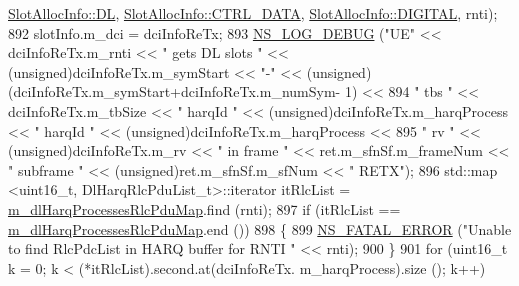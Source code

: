 \begin{DoxyCode}
      \hyperlink{structns3_1_1SlotAllocInfo_a6cad60db1d39034f1851e2cea625fe5da9a365c9c56b7c32dcae38ee1a468ce6d}{SlotAllocInfo::DL}, \hyperlink{structns3_1_1SlotAllocInfo_a3ea7cb503bfd0c9a4df55a71b81b9331a1ea636c3f068558fabacbc39934309b8}{SlotAllocInfo::CTRL\_DATA}, 
      \hyperlink{structns3_1_1SlotAllocInfo_adcbd067d82be6260b3399167d8f0b4eca47a67c342db658a08ded9ce4b49417ea}{SlotAllocInfo::DIGITAL}, rnti);
892                                         slotInfo.m\_dci = dciInfoReTx;
893                                         \hyperlink{group__logging_ga413f1886406d49f59a6a0a89b77b4d0a}{NS\_LOG\_DEBUG} (\textcolor{stringliteral}{"UE"} << dciInfoReTx.m\_rnti << \textcolor{stringliteral}{" gets DL
       slots "} << (\textcolor{keywordtype}{unsigned})dciInfoReTx.m\_symStart << \textcolor{stringliteral}{"-"} << (\textcolor{keywordtype}{unsigned})(dciInfoReTx.m\_symStart+dciInfoReTx.m\_numSym-
      1) <<
894                                                                      \textcolor{stringliteral}{" tbs "} << dciInfoReTx.m\_tbSize << \textcolor{stringliteral}{"
       harqId "} << (\textcolor{keywordtype}{unsigned})dciInfoReTx.m\_harqProcess << \textcolor{stringliteral}{" harqId "} << (\textcolor{keywordtype}{unsigned})dciInfoReTx.m\_harqProcess <<
895                                                                      \textcolor{stringliteral}{" rv "} << (\textcolor{keywordtype}{unsigned})dciInfoReTx.m\_rv 
      << \textcolor{stringliteral}{" in frame "} << ret.m\_sfnSf.m\_frameNum << \textcolor{stringliteral}{" subframe "} << (\textcolor{keywordtype}{unsigned})ret.m\_sfnSf.m\_sfNum << \textcolor{stringliteral}{" RETX"});
896                                         std::map <uint16\_t, DlHarqRlcPduList\_t>::iterator itRlcList =  
      \hyperlink{classns3_1_1MmWaveFlexTtiMaxWeightMacScheduler_aa9cdf43f057d1bd8e1cfcf2a21ea89f0}{m\_dlHarqProcessesRlcPduMap}.find (rnti);
897                                         \textcolor{keywordflow}{if} (itRlcList == 
      \hyperlink{classns3_1_1MmWaveFlexTtiMaxWeightMacScheduler_aa9cdf43f057d1bd8e1cfcf2a21ea89f0}{m\_dlHarqProcessesRlcPduMap}.end ())
898                                         \{
899                                                 \hyperlink{group__fatal_ga5131d5e3f75d7d4cbfd706ac456fdc85}{NS\_FATAL\_ERROR} (\textcolor{stringliteral}{"Unable to find RlcPdcList in
       HARQ buffer for RNTI "} << rnti);
900                                         \}
901                                         \textcolor{keywordflow}{for} (uint16\_t k = 0; k < (*itRlcList).second.at(dciInfoReTx.
      m\_harqProcess).size (); k++)

\end{DoxyCode}
